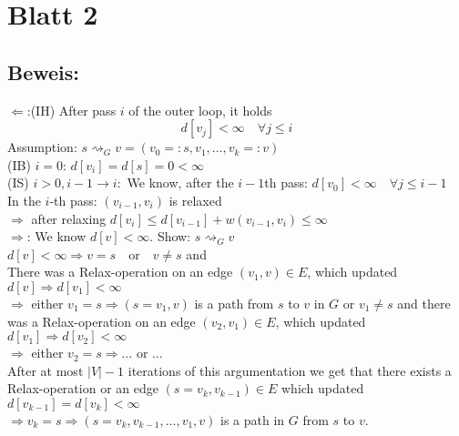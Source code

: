 \documentclass[12pt,oneside,a4paper,parskip=on,fleqn]{scrartcl}
\begin{document}
\section*{Blatt 2}
\subsection*{Beweis:}
\glqq$\Leftarrow$\grqq:(IH) After pass $i$ of the outer loop, it holds
$$d[v_j] < \infty\quad \forall j \leq i$$
Assumption: $s \rightsquigarrow_G v = (v_0 =:s, v_1, \ldots, v_k =: v)$\\
(IB) $i=0$: $d[v_i] = d[s] = 0 < \infty$\\
(IS) $i>0, i-1\rightarrow i:$ We know, after the $i-1$th pass: $d[v_0] < \infty\quad \forall j\leq i-1$\\
In the $i$-th pass: $(v_{i-1},v_i)$ is relaxed\\
$\Rightarrow$ after relaxing $d[v_i] \leq d[v_{i-1}] + w(v_{i-1},v_{i}) \leq \infty$\\

\glqq$\Rightarrow$\grqq: We know $d[v] < \infty$. Show: $s \rightsquigarrow_G v$\\
$d[v] < \infty \Rightarrow v=s\quad \text{or}\quad v\neq s$ and\\
There was a Relax-operation on an edge $(v_1, v) \in E$, which updated $d[v] \Rightarrow d[v_1] < \infty$\\
$\Rightarrow$ either $v_1 = s \Rightarrow (s=v_1,v)$ is a path from $s$ to $v$ in $G$ or $v_1 \neq s$ and there was a Relax-operation on an edge
$(v_2,v_1)\in E$, which updated $d[v_1] \Rightarrow d[v_2] < \infty$\\
$\Rightarrow$ either $v_2 = s \Rightarrow \ldots$ or $\ldots$\\
After at most $|V| - 1$ iterations of this argumentation we get that there exists a Relax-operation or an edge $(s=v_k, v_{k-1})\in E$ which updated $d[v_{k-1}] = d[v_k] <\infty$\\
$\Rightarrow v_k = s \Rightarrow (s=v_k,v_{k-1},\ldots,v_1,v)$ is a path in $G$ from $s$ to $v$.
\end{document}
